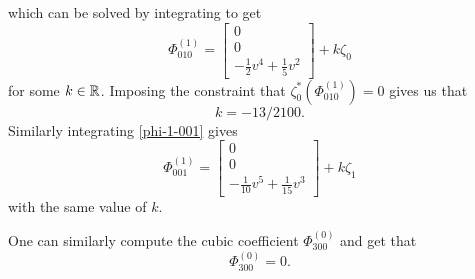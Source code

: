 which can be solved by integrating to get 
\begin{equation}
	\Phi_{010}^{(1)} = \begin{bmatrix}
		0 \\ 0 \\ - \frac 1 2 v^4 + \frac 1 5 v^2
	\end{bmatrix} + k  \zeta_0
\end{equation}
for some \(k\in \mathbb{R}\). Imposing the constraint that \(\zeta_0^*(\Phi_{010}^{(1)}) = 0\) gives us that \[k = -13/2100.\] Similarly integrating \cref{phi-1-001} gives
\begin{equation}
	\Phi_{001}^{(1)} = \begin{bmatrix}
		0 \\ 0 \\ - \frac 1 {10} v^5 + \frac 1 {15} v^3
	\end{bmatrix} + k  \zeta_1
\end{equation}
with the same value of \(k\).

One can similarly compute the cubic coefficient \(\Phi_{300}^{(0)}\) and get that
\begin{equation}
	\Phi_{300}^{(0)} = 0.
\end{equation}

